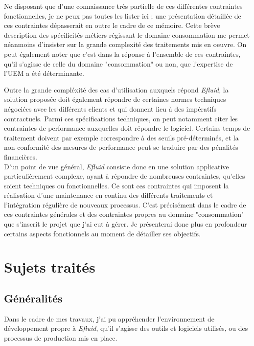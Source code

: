 \documentclass[a4paper, 12pt]{report}
\begin{document}
Ne disposant que d'une connaissance très partielle de ces différentes contraintes fonctionnelles, je ne peux pas toutes les lister ici ; une présentation détaillée de ces contraintes dépasserait en outre le cadre de ce mémoire. Cette brève description des spécificités métiers régissant le domaine consommation me permet néanmoins d'insister sur la grande complexité des traitements mis en oeuvre. On peut également noter que c'est dans la réponse à l'ensemble de ces contraintes, qu'il s'agisse de celle du domaine "consommation" ou non, que l'expertise de l'UEM a été déterminante.

Outre la grande compléxité des cas d'utilisation auxquels répond \textit{Efluid}, la solution proposée doit également répondre de certaines normes techniques négociées avec les différents clients et qui donnent lieu à des impératifs contractuels. Parmi ces spécifications techniques, on peut notamment citer les contraintes de performance auxquelles doit répondre le logiciel. Certains temps de traitement doivent par exemple correspondre à des seuils pré-déterminés, et la non-conformité des mesures de performance peut se traduire par des pénalités financières.\\

D'un point de vue général, \textit{Efluid} consiste donc en une solution applicative particulièrement complexe, ayant à répondre de nombreuses contraintes, qu'elles soient techniques ou fonctionnelles. Ce sont ces contraintes qui imposent la réalisation d'une maintenance en continu des différents traitements et l'intégration régulière de nouveaux processus. C'est précisément dans le cadre de ces contraintes générales et des contraintes propres au domaine "consommation" que s'inscrit le projet que j'ai eut à gérer. Je présenterai donc plus en profondeur certains aspects fonctionnels au moment de détailler ses objectifs.

\chapter{Sujets traités}

\section{Généralités}

Dans le cadre de mes travaux, j'ai pu appréhender l'environnement de développement propre à \textit{Efluid}, qu'il s'agisse des outils et logiciels utilisés, ou des processus de production mis en place.
\end{document}
